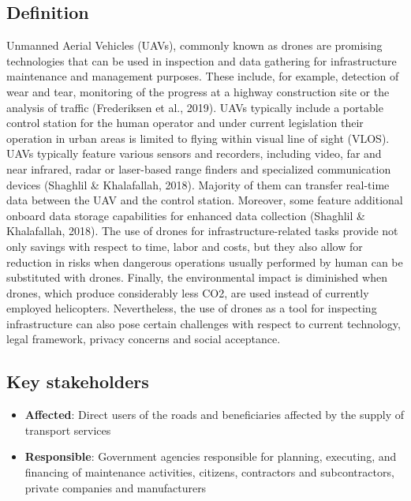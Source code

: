 \documentclass[
]{book}
\providecommand{\tightlist}{%
  \setlength{\itemsep}{0pt}\setlength{\parskip}{0pt}}
\begin{document}
\hypertarget{definition-3}{%
\subsection*{Definition}\label{definition-3}}

Unmanned Aerial Vehicles (UAVs), commonly known as drones are promising technologies that can be used in inspection and data gathering for infrastructure maintenance and management purposes. These include, for example, detection of wear and tear, monitoring of the progress at a highway construction site or the analysis of traffic (Frederiksen et al., 2019). UAVs typically include a portable control station for the human operator and under current legislation their operation in urban areas is limited to flying within visual line of sight (VLOS). UAVs typically feature various sensors and recorders, including video, far and near infrared, radar or laser-based range finders and specialized communication devices (Shaghlil \& Khalafallah, 2018). Majority of them can transfer real-time data between the UAV and the control station. Moreover, some feature additional onboard data storage capabilities for enhanced data collection (Shaghlil \& Khalafallah, 2018). The use of drones for infrastructure-related tasks provide not only savings with respect to time, labor and costs, but they also allow for reduction in risks when dangerous operations usually performed by human can be substituted with drones. Finally, the environmental impact is diminished when drones, which produce considerably less CO2, are used instead of currently employed helicopters. Nevertheless, the use of drones as a tool for inspecting infrastructure can also pose certain challenges with respect to current technology, legal framework, privacy concerns and social acceptance.

\hypertarget{key-stakeholders-3}{%
\subsection*{Key stakeholders}\label{key-stakeholders-3}}

\begin{itemize}
\tightlist
\item
  \textbf{Affected}: Direct users of the roads and beneficiaries affected by the supply of transport services
\item
  \textbf{Responsible}: Government agencies responsible for planning, executing, and financing of maintenance activities, citizens, contractors and subcontractors, private companies and manufacturers
\end{itemize}
\end{document}

